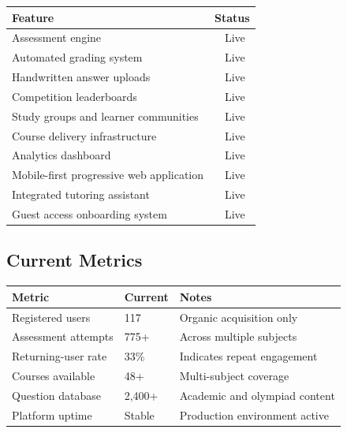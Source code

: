 \documentclass[a4paper,11pt]{article}
\newcommand{\yes}{\textcolor{emeraldbrand}{\ding{51}}}
\begin{document}
\begin{table}[h]
\centering
\begin{tabular}{@{}p{} c@{}}
\toprule
\rowcolor{indigobg}
\textcolor{indigobrand}{\textbf{Feature}} & \textcolor{indigobrand}{\textbf{Status}} \\
\midrule
Assessment engine & \yes\ Live \\
Automated grading system & \yes\ Live \\
Handwritten answer uploads & \yes\ Live \\
Competition leaderboards & \yes\ Live \\
Study groups and learner communities & \yes\ Live \\
Course delivery infrastructure & \yes\ Live \\
Analytics dashboard & \yes\ Live \\
Mobile-first progressive web application & \yes\ Live \\
Integrated tutoring assistant & \yes\ Live \\
Guest access onboarding system & \yes\ Live \\
\bottomrule
\end{tabular}
\end{table}

\subsection*{Current Metrics}

\begin{table}[h]
\centering
\begin{tabular}{@{}p{} p{} p{}@{}}
\toprule
\rowcolor{indigobg}
\textcolor{indigobrand}{\textbf{Metric}} & \textcolor{indigobrand}{\textbf{Current}} & \textcolor{indigobrand}{\textbf{Notes}} \\
\midrule
Registered users & 117 & Organic acquisition only \\
Assessment attempts & 775+ & Across multiple subjects \\
Returning-user rate & 33\% & Indicates repeat engagement \\
Courses available & 48+ & Multi-subject coverage \\
Question database & 2,400+ & Academic and olympiad content \\
Platform uptime & Stable & Production environment active \\
\bottomrule
\end{tabular}
\end{table}
\end{document}
